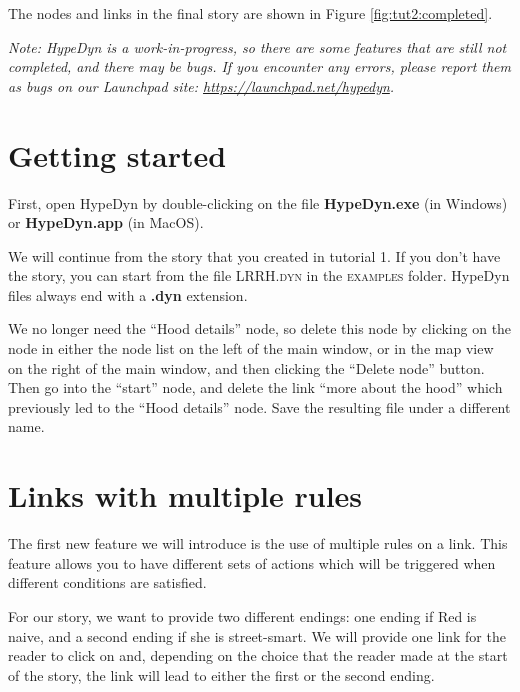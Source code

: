 \documentclass{article}
\begin{document}
The nodes and links in the final story are shown in Figure \ref{fig:tut2:completed}.

\textit{Note:  HypeDyn is a work-in-progress, so there are some features that are still
not completed, and there may be bugs. If you encounter any errors, please
report them as bugs on our Launchpad site: \url{https://launchpad.net/hypedyn}.}

\section{Getting started}

First, open HypeDyn by double-clicking on the file \textbf{HypeDyn.exe} (in
Windows) or \textbf{HypeDyn.app} (in MacOS).

We will continue from the story that you created in tutorial 1. If you don't
have the story, you can start from the file \textsc{LRRH.dyn} in the
\textsc{examples} folder. HypeDyn files always end with a \textbf{.dyn} extension.


We no longer need the ``Hood details'' node, so delete this node by clicking on
the node in either the node list on the left of the main window, or in the
map view on the right of the main window, and then clicking the ``Delete node''
button. Then go into the ``start'' node, and delete the link ``more about
the hood'' which previously led to the ``Hood details'' node. Save the resulting
file under a different name.


\section{Links with multiple rules}

The first new feature we will introduce is the use of multiple rules on a link.
This feature allows you to have different sets of actions which will be
triggered when different conditions are satisfied.

For our story, we want to provide two different endings: one ending if Red is
naive, and a second ending if she is street-smart. We will provide one link for
the reader to click on and, depending on the choice that the reader made at the
start of the story, the link will lead to either the first or the second ending.
\end{document}
